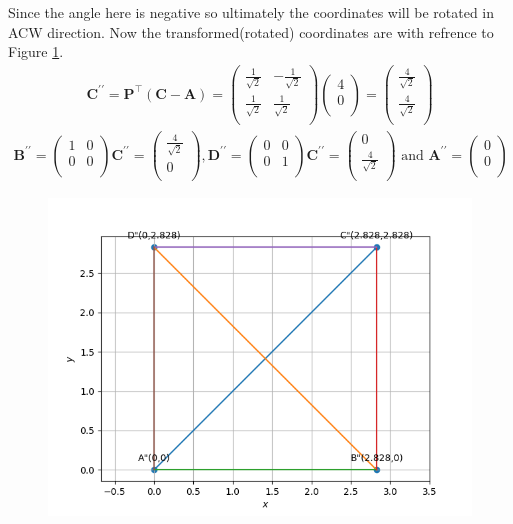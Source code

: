 \documentclass[12pt]{article}
\newcommand{\myvec}[1]{\ensuremath{\begin{pmatrix}#1\end{pmatrix}}}
\let\vec\mathbf
\begin{document}
Since the angle here is negative so ultimately the coordinates will be rotated in ACW direction. Now the transformed(rotated) coordinates are with refrence to Figure \ref{fig:Fig3}.
\begin{align}
\vec{C^{\prime \prime}} = \vec{P}^\top (\vec{C}-\vec{A}) =
\myvec{
\frac{1}{\sqrt{2}} & -\frac{1}{\sqrt{2}} \\
\frac{1}{\sqrt{2}} & \frac{1}{\sqrt{2}}\\
}
\myvec{
4 \\
0\\
} = 
\myvec{
\frac{4}{\sqrt{2}} \\
\frac{4}{\sqrt{2}}\\
}
\end{align}
\begin{align}
\vec{B^{\prime \prime}} = \myvec{
 1&0\\
 0&0\\
}\vec{C^{\prime \prime}}=
\myvec{
 \frac{4}{\sqrt{2}}\\
 0\\
},
\vec{D^{\prime \prime}} = \myvec{
 0&0\\
 0&1\\
}\vec{C^{\prime \prime}}=
\myvec{
 0\\
 \frac{4}{\sqrt{2}}\\
} \text{ and }
\vec{A^{\prime \prime}} =
\myvec{
0 \\
0\\
}
\end{align}

\begin{figure}[!h]
	\begin{center} 
	    \includegraphics[width=\columnwidth]{figs/square2}
	\end{center}
\caption{}
\label{fig:Fig3}
\end{figure}
\end{document}

